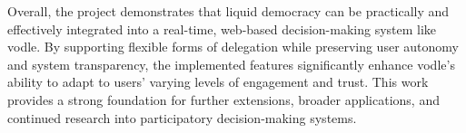 Overall, the project demonstrates that liquid democracy can be practically and effectively integrated into a real-time, web-based decision-making system like vodle. By supporting flexible forms of delegation while preserving user autonomy and system transparency, the implemented features significantly enhance vodle's ability to adapt to users' varying levels of engagement and trust. This work provides a strong foundation for further extensions, broader applications, and continued research into participatory decision-making systems.






